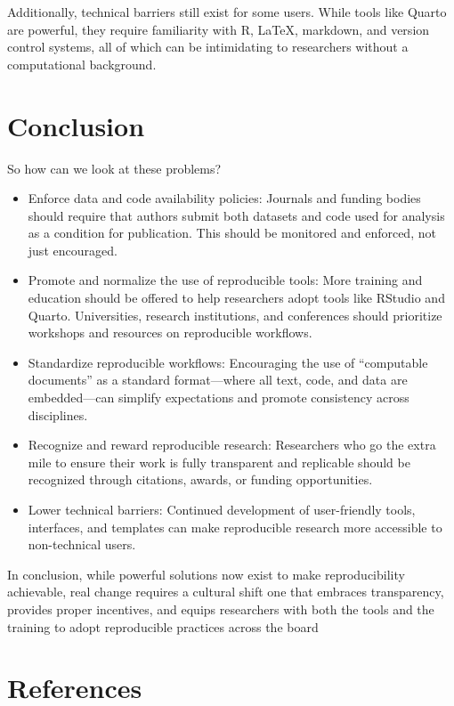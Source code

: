 \documentclass[
  british,
  a4paper,
]{article}
\providecommand{\tightlist}{%
  \setlength{\itemsep}{0pt}\setlength{\parskip}{0pt}}
\begin{document}
Additionally, technical barriers still exist for some users. While tools
like Quarto are powerful, they require familiarity with R, LaTeX,
markdown, and version control systems, all of which can be intimidating
to researchers without a computational background.

\section{Conclusion}\label{conclusion}

So how can we look at these problems?

\begin{itemize}
\tightlist
\item
  Enforce data and code availability policies: Journals and funding
  bodies should require that authors submit both datasets and code used
  for analysis as a condition for publication. This should be monitored
  and enforced, not just encouraged.
\item
  Promote and normalize the use of reproducible tools: More training and
  education should be offered to help researchers adopt tools like
  RStudio and Quarto. Universities, research institutions, and
  conferences should prioritize workshops and resources on reproducible
  workflows.
\item
  Standardize reproducible workflows: Encouraging the use of
  ``computable documents'' as a standard format---where all text, code,
  and data are embedded---can simplify expectations and promote
  consistency across disciplines.
\item
  Recognize and reward reproducible research: Researchers who go the
  extra mile to ensure their work is fully transparent and replicable
  should be recognized through citations, awards, or funding
  opportunities.
\item
  Lower technical barriers: Continued development of user-friendly
  tools, interfaces, and templates can make reproducible research more
  accessible to non-technical users.
\end{itemize}

In conclusion, while powerful solutions now exist to make
reproducibility achievable, real change requires a cultural shift one
that embraces transparency, provides proper incentives, and equips
researchers with both the tools and the training to adopt reproducible
practices across the board

\section{References}\label{references}
\end{document}
